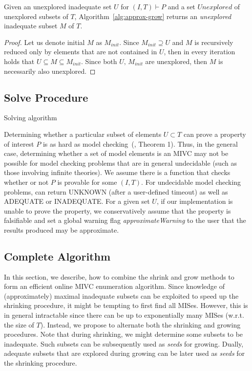\begin{proposition}
Given an unexplored inadequate set $U$ for $(I,T) \vdash P$ and a set $\mathit{Unexplored}$ of unexplored subsets of $T$, Algorithm~\ref{alg:approx-grow} returns an \emph{unexplored} inadequate subset $M$ of $T$.
\end{proposition}

\begin{proof}
Let us denote initial $M$ as $M_{init}$. Since $M_{init} \supseteq U$ and $M$ is recursively reduced only by elements that are not contained in $U$, then in every iteration holds that $U \subseteq M \subseteq M_{init}$. Since both $U, \, M_{init}$ are unexplored, then $M$ is necessarily also unexplored.
\end{proof}

\subsection{Solve Procedure}

\begin{algorithm}

\caption{Solving algorithm}
\label{alg:solve}
\end{algorithm}

Determining whether a particular subset of elements $U \subset T$ can prove a property of interest $P$ is as hard as model checking~(\cite{Ghass16}, Theorem 1).  Thus, in the general case, determining whether a set of model elements is an MIVC may not be possible for model checking problems that are in general undecidable (such as those involving infinite theories).  We assume there is a function \CheckAdq that checks
whether or not $P$ is provable for some $(I, T)$.  For undecidable
model checking problems, \CheckAdq can return UNKNOWN
(after a user-defined timeout) as well as ADEQUATE
or INADEQUATE.  For a given set $U$, if our implementation is
unable to prove the property, we conservatively assume that
the property is falsifiable and set a global warning flag {\em approximateWarning} to the
user that the results produced may be approximate.  
 
% 


\subsection{Complete Algorithm}
In this section, we describe, how to combine the shrink and grow methods to form an efficient online MIVC enumeration algorithm.
Since knowledge of (approximately) maximal inadequate subsets can be exploited to speed up the shrinking procedure, it might be tempting to first find all MISes.
However, this is in general intractable since there can be up to exponentially many MISes (w.r.t. the size of $T$).
Instead, we propose to alternate both the shrinking and growing procedures.
Note that during shrinking, we might determine some subsets to be inadequate. Such subsets can be subsequently used as \emph{seeds} for growing.
Dually, adequate subsets that are explored during growing can be later used as \emph{seeds} for the shrinking procedure.

